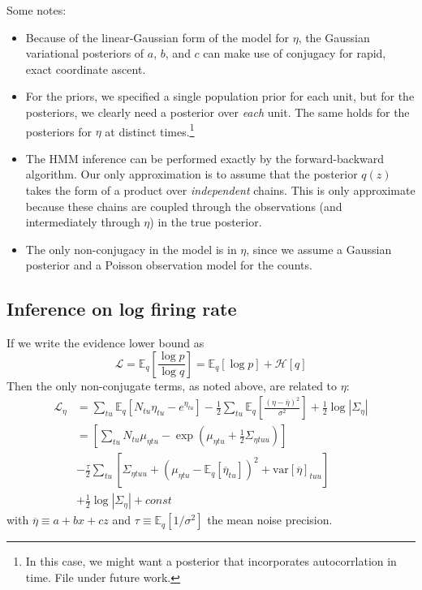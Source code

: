 \documentclass[11pt]{article}
\begin{document}
Some notes:
\begin{itemize}
    \item Because of the linear-Gaussian form of the model for $\eta$, the Gaussian variational posteriors of $a$, $b$, and $c$ can make use of conjugacy for rapid, exact coordinate ascent.
    \item For the priors, we specified a single population prior for each unit, but for the posteriors, we clearly need a posterior over \emph{each} unit. The same holds for the posteriors for $\eta$ at distinct times.\footnote{In this case, we might want a posterior that incorporates autocorrlation in time. File under future work.}
    \item The HMM inference can be performed exactly by the forward-backward algorithm. Our only approximation is to assume that the posterior $q(z)$ takes the form of a product over \emph{independent} chains. This is only approximate because these chains are coupled through the observations (and intermediately through $\eta$) in the true posterior.
    \item The only non-conjugacy in the model is in $\eta$, since we assume a Gaussian posterior and a Poisson observation model for the counts.
\end{itemize}

\subsection{Inference on log firing rate}
If we write the evidence lower bound as
\begin{equation}
    \mathcal{L} = \mathbb{E}_q \left[ \frac{\log p}{\log q}\right] = 
    \mathbb{E}_q[\log p] + \mathcal{H}[q]
\end{equation}
Then the only non-conjugate terms, as noted above, are related to $\eta$:
\begin{align}
    \mathcal{L}_\eta &= 
    \sum_{tu} \mathbb{E}_q[N_{tu} \eta_{tu} - e^{\eta_{tu}}]
    - \frac{1}{2} \sum_{tu} \mathbb{E}_q \left[ \frac{(\eta - \overline{\eta})^2}{\sigma^2} \right]
    + \frac{1}{2} \log |\Sigma_\eta| \\
    &= \left[ \sum_{tu} N_{tu} \mu_{\eta tu} - 
    \exp\left(\mu_{\eta tu} + \frac{1}{2} \Sigma_{\eta tuu} \right)\right] \\
    &- \frac{\tau}{2} \sum_{tu} 
    \left[ \Sigma_{\eta tuu} + (\mu_{\eta tu} - \mathbb{E}_q[\overline{\eta}_{tu}])^2 
    + \mathrm{var}[\overline{\eta}]_{tuu}\right] \\
    &+ \frac{1}{2} \log |\Sigma_\eta| + const
\end{align}
with $\overline{\eta} \equiv a + bx + cz$ and $\tau \equiv \mathbb{E}_q[1/\sigma^2]$ the mean noise precision.
\end{document}
